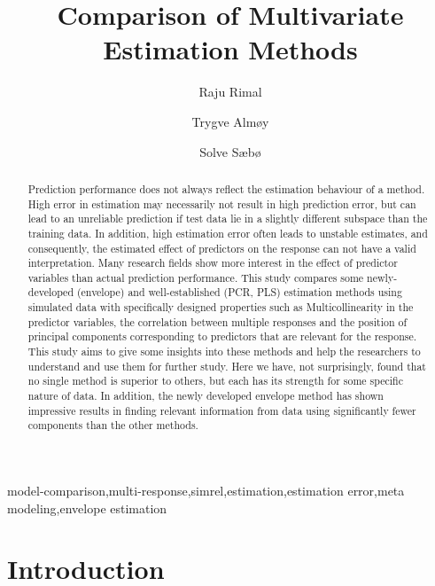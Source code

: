 \documentclass[12pt,3p,authoryear]{elsarticle}
\begin{document}
\begin{frontmatter}

  \title{Comparison of Multivariate Estimation Methods}
  
    \author[KBM]{Raju Rimal}
    \author[KBM]{Trygve Almøy}
  
    \author[KBM]{Solve Sæbø}
  
      \address[KBM]{Faculty of Chemistry and Bioinformatics, Norwegian University of Life Sciences, Ås, Norway}
  
  \begin{abstract}
  Prediction performance does not always reflect the estimation behaviour of a method. High error in estimation may necessarily not result in high prediction error, but can lead to an unreliable prediction if test data lie in a slightly different subspace than the training data. In addition, high estimation error often leads to unstable estimates, and consequently, the estimated effect of predictors on the response can not have a valid interpretation. Many research fields show more interest in the effect of predictor variables than actual prediction performance. This study compares some newly-developed (envelope) and well-established (PCR, PLS) estimation methods using simulated data with specifically designed properties such as Multicollinearity in the predictor variables, the correlation between multiple responses and the position of principal components corresponding to predictors that are relevant for the response. This study aims to give some insights into these methods and help the researchers to understand and use them for further study. Here we have, not surprisingly, found that no single method is superior to others, but each has its strength for some specific nature of data. In addition, the newly developed envelope method has shown impressive results in finding relevant information from data using significantly fewer components than the other methods.
  \end{abstract}
   \begin{keyword} model-comparison,multi-response,simrel,estimation,estimation error,meta modeling,envelope estimation\end{keyword}

\end{frontmatter}

\hypertarget{introduction}{%
\section{Introduction}\label{introduction}}
\end{document}

